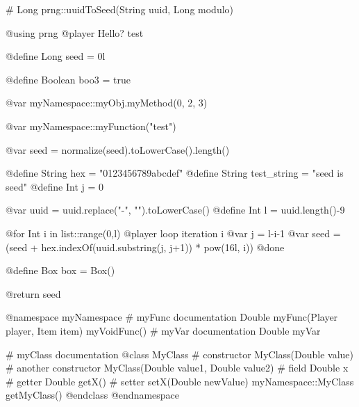 \documentclass{article}
\begin{document}
    
\begin{msccode}
# Long prng::uuidToSeed(String uuid, Long modulo)

@using prng
@player Hello? test

@define Long seed = 0l

@define Boolean boo3 = true

@var myNamespace::myObj.myMethod(0, 2, 3)

@var myNamespace::myFunction("test")

@var seed = normalize(seed).toLowerCase().length()

@define String hex = "0123456789abcdef"
@define String test_string = "seed is {{seed}}"
@define Int j = 0

@var uuid = uuid.replace("-", "").toLowerCase()
@define Int l = uuid.length()-9

@for Int i in list::range(0,l)
    @player loop iteration {{i}}
    @var j = l-i-1
    @var seed = (seed + hex.indexOf(uuid.substring(j, j+1)) * pow(16l, i)) %
@done

@define Box box = Box()

@return seed
\end{msccode}

\begin{nmscode}
@namespace myNamespace
	# myFunc documentation
	Double myFunc(Player player, Item item)
	myVoidFunc()
	# myVar documentation
	Double myVar

	# myClass documentation
	@class MyClass
		# constructor
		MyClass(Double value)
		# another constructor
		MyClass(Double value1, Double value2)
		# field
		Double x
		# getter
		Double getX()
		# setter
		setX(Double newValue)
		myNamespace::MyClass getMyClass()
	@endclass
@endnamespace
\end{nmscode}
\end{document}
